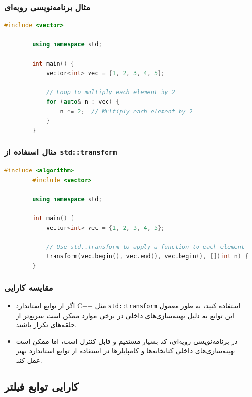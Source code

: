 \documentclass[12pt, a4paper]{report}
\begin{document}
\subsubsection{مثال برنامه‌نویسی رویه‌ای}
\begin{LTR}
	\begin{lstlisting}[language=C++, breaklines=true]
		#include <vector>
		
		using namespace std;
		
		int main() {
			vector<int> vec = {1, 2, 3, 4, 5};
			
			// Loop to multiply each element by 2
			for (auto& n : vec) {
				n *= 2;  // Multiply each element by 2
			}
		}
	\end{lstlisting}
\end{LTR}

\subsubsection{مثال استفاده از \texttt{std::transform}}
\begin{LTR}
	\begin{lstlisting}[language=C++, breaklines=true]
		#include <algorithm>
		#include <vector>
		
		using namespace std;
		
		int main() {
			vector<int> vec = {1, 2, 3, 4, 5};
			
			// Use std::transform to apply a function to each element
			transform(vec.begin(), vec.end(), vec.begin(), [](int n) { return n * 2; });
		}
	\end{lstlisting}
\end{LTR}

\subsubsection{مقایسه کارایی}
\begin{itemize}
	\item اگر از توابع استاندارد C++ مثل \texttt{std::transform} استفاده کنید، به طور معمول این توابع به دلیل بهینه‌سازی‌های داخلی در برخی موارد ممکن است سریع‌تر از حلقه‌های تکرار باشند.
	\item در برنامه‌نویسی رویه‌ای، کد بسیار مستقیم و قابل کنترل است، اما ممکن است بهینه‌سازی‌های داخلی کتابخانه‌ها و کامپایلرها در استفاده از توابع استاندارد بهتر عمل کند.
\end{itemize}


\subsection{کارایی توابع فیلتر}
\end{document}
